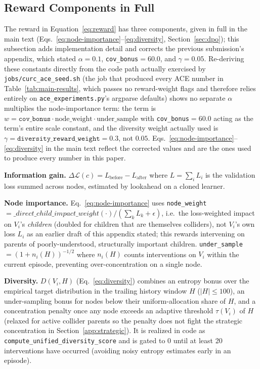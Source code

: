 \subsection{Reward Components in Full}
\label{app:reward}

The reward in Equation~\eqref{eq:reward} has three components, given in full in the main text (Eqs.~\ref{eq:node-importance}--\ref{eq:diversity}, Section~\ref{sec:dpo}); this subsection adds implementation detail and corrects the previous submission's appendix, which stated $\alpha=0.1$, \texttt{cov\_bonus}$=60.0$, and $\gamma=0.05$. Re-deriving these constants directly from the code path actually exercised by \texttt{jobs/curc\_ace\_seed.sh} (the job that produced every ACE number in Table~\ref{tab:main-results}, which passes no reward-weight flags and therefore relies entirely on \texttt{ace\_experiments.py}'s argparse defaults) shows no separate $\alpha$ multiplies the node-importance term: the term is $w = \texttt{cov\_bonus} \cdot \text{node\_weight} \cdot \text{under\_sample}$ with \texttt{cov\_bonus}$=60.0$ acting as the term's entire scale constant, and the diversity weight actually used is $\gamma=\texttt{diversity\_reward\_weight}=0.3$, not $0.05$. Eqs.~\ref{eq:node-importance}--\ref{eq:diversity} in the main text reflect the corrected values and are the ones used to produce every number in this paper.

\textbf{Information gain.} $\Delta\mathcal{L}(c) = L_\text{before} - L_\text{after}$ where $L = \sum_i L_i$ is the validation loss summed across nodes, estimated by lookahead on a cloned learner.

\textbf{Node importance.} Eq.~\ref{eq:node-importance} uses \texttt{node\_weight}$= \_direct\_child\_impact\_weight(\cdot)/(\sum_k L_k + \epsilon)$, i.e.\ the loss-weighted impact on $V_i$'s \emph{children} (doubled for children that are themselves colliders), not $V_i$'s own loss $L_i$ as an earlier draft of this appendix stated; this rewards intervening on parents of poorly-understood, structurally important children. \texttt{under\_sample}$=(1+n_i(H))^{-1/2}$ where $n_i(H)$ counts interventions on $V_i$ within the current episode, preventing over-concentration on a single node.

\textbf{Diversity.} $D(V_i, H)$ (Eq.~\ref{eq:diversity}) combines an entropy bonus over the empirical target distribution in the trailing history window $H$ ($|H|\le 100$), an under-sampling bonus for nodes below their uniform-allocation share of $H$, and a concentration penalty once any node exceeds an adaptive threshold $\tau(V_i)$ of $H$ (relaxed for active collider parents so the penalty does not fight the strategic concentration in Section~\ref{app:strategic}). It is realized in code as \texttt{compute\_unified\_diversity\_score} and is gated to $0$ until at least 20 interventions have occurred (avoiding noisy entropy estimates early in an episode).

